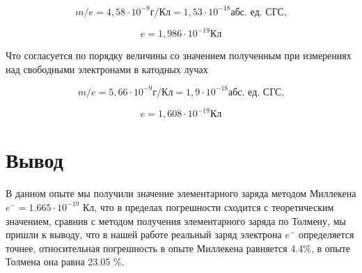 \documentclass{lab}
\begin{document}
\begin{equation}
    m/e = 4,58 \cdot 10^{-9} \text{г/Кл} = 1,53 \cdot 10^{-18} \text{абс. ед. СГС,}
\end{equation}

\begin{equation}
    e = 1,986\cdot 10^{-19} \text{Кл}
\end{equation}

Что согласуется по порядку величины со значением полученным при измерениях над свободными электронами в катодных лучах

\begin{equation}
    m/e = 5,66 \cdot 10^{-9} \text{г/Кл}  = 1,9 \cdot 10^{-18} \text{абс. ед. СГС,}
\end{equation}

\begin{equation}
    e = 1,608\cdot 10^{-19} \text{Кл}
\end{equation}

\section{Вывод}
В данном опыте мы получили значение элементарного заряда методом Миллекена $e^{-} = 1.665 \cdot10^{-19} \text{ Кл}$, что в пределах погрешности сходится с теоретическим значением, сравнив с методом получения элементарного заряда по Толмену, мы пришли к выводу, что в нашей работе реальный заряд электрона $e^{-}$ определяется точнее, относительная погрешность в опыте Миллекена равняется 4.4\%, в опыте Толмена она равна 23.05 \%.
\end{document}
